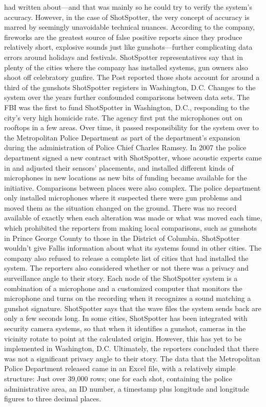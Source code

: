 had written about—and that was mainly so he could try to verify the system's
accuracy.
However, in the case of ShotSpotter, the very concept of accuracy is
marred by seemingly unavoidable technical nuances. According to the
company, fireworks are the greatest source of false positive reports since
they produce relatively short, explosive sounds just like gunshots—further
complicating data errors around holidays and festivals. ShotSpotter representatives
say that in plenty of the cities where the company has installed
systems, gun owners also shoot off celebratory gunfire. The Post reported
those shots account for around a third of the gunshots ShotSpotter registers
in Washington, D.C.
Changes to the system over the years further confounded comparisons
between data sets. The FBI was the first to fund ShotSpotter in Washington,
D.C., responding to the city's very high homicide rate. The agency first
put the microphones out on rooftops in a few areas. Over time, it passed
responsibility for the system over to the Metropolitan Police Department
as part of the department's expansion during the administration of Police
Chief Charles Ramsey. In 2007 the police department signed a new contract
with ShotSpotter, whose acoustic experts came in and adjusted their sensors'
placements, and installed different kinds of microphones in new locations
as new bits of funding became available for the initiative.
Comparisons between places were also complex. The police department
only installed microphones where it suspected there were gun problems and
moved them as the situation changed on the ground. There was no record
available of exactly when each alteration was made or what was moved each
time, which prohibited the reporters from making local comparisons, such
as gunshots in Prince George County to those in the District of Columbia.
ShotSpotter wouldn't give Fallis information about what its systems found
in other cities. The company also refused to release a complete list of cities
that had installed the system.
The reporters also considered whether or not there was a privacy and surveillance
angle to their story. Each node of the ShotSpotter system is a
combination of a microphone and a customized computer that monitors
the microphone and turns on the recording when it recognizes a sound
matching a gunshot signature. ShotSpotter says that the wave files the system
sends back are only a few seconds long. In some cities, ShotSpotter
has been integrated with security camera systems, so that when it identifies
a gunshot, cameras in the vicinity rotate to point at the calculated origin.
However, this has yet to be implemented in Washington, D.C. Ultimately,
the reporters concluded that there was not a significant privacy angle to
their story.
The data that the Metropolitan Police Department released came in an
Excel file, with a relatively simple structure: Just over 39,000 rows; one for
each shot, containing the police administrative area, an ID number, a timestamp
plus longitude and longitude figures to three decimal places.

